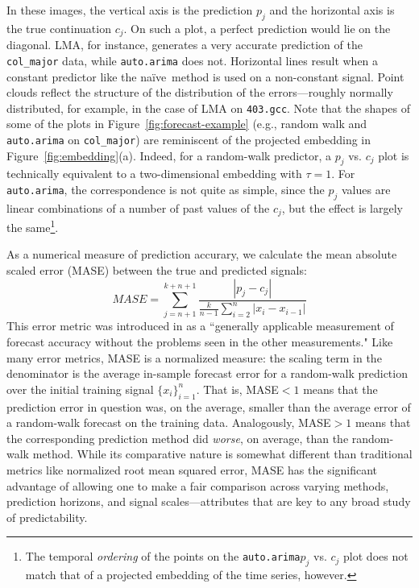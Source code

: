 \documentclass[%
pre,
reprint,
superscriptaddress,
showpacs,
nofootinbib,
nobibnotes,
 amsmath,amssymb,
 aps,
]{revtex4-1}
\newcommand{\gcc}{{\tt 403.gcc}\xspace}
\newcommand{\arima}{{\tt auto.arima}\xspace}
\newcommand{\naive}{na\"ive}
\newcommand{\col}{{\tt col\_major}\xspace}
\begin{document}
In these images, the vertical axis is the prediction $p_j$ and the
horizontal axis is the true continuation $c_j$.  On such a plot, a
perfect prediction would lie on the diagonal.  LMA, for instance,
generates a very accurate prediction of the \col data, while \arima
does not.  Horizontal lines result when a constant predictor like the
\naive ~method is used on a non-constant signal.  Point clouds reflect
the structure of the distribution of the errors---roughly normally
distributed, for example, in the case of LMA on \gcc.  Note that the
shapes of some of the plots in Figure~\ref{fig:forecast-example}
(e.g., random walk and \arima on \col) are reminiscent of the
projected embedding in Figure~\ref{fig:embedding}(a).  Indeed, for a
random-walk predictor, a $p_j$ vs. $c_j$ plot is technically
equivalent to a two-dimensional embedding with $\tau=1$.  For \arima,
the correspondence is not quite as simple, since the $p_j$ values are
linear combinations of a number of past values of the $c_j$, but the
effect is largely the same\footnote{The temporal \emph{ordering} of
  the points on the \arima $p_j$ vs. $c_j$ plot does not match that of
  a projected embedding of the time series, however.}.

As a numerical measure of prediction accurary, we calculate the mean
absolute scaled error (MASE) between the true and predicted signals:
%
$$MASE = \sum_{j=n+1}^{k+n+1}\frac{|p_j-c_j|
}{\frac{k}{n-1}\sum^n_{i=2}|x_{i}-x_{i-1}|}$$
%
This error metric was introduced in \cite{MASE} as a ``generally
applicable measurement of forecast accuracy without the problems seen
in the other measurements."  Like many error metrics, MASE is a
normalized measure: the scaling term in the denominator
%
%
is the average in-sample forecast error for a random-walk prediction
over the initial training signal $\{x_i\}^n_{i=1}$.  That is, MASE$<1$
means that the prediction error in question was, on the average,
smaller than the average error of a random-walk forecast on the
training data.  Analogously, MASE$>1$ means that the corresponding
prediction method did \emph{worse}, on average, than the random-walk
method.  While its comparative nature is somewhat different than
traditional metrics like normalized root mean squared error, MASE has
the significant advantage of allowing one to make a fair comparison
across varying methods, prediction horizons, and signal
scales---attributes that are key to any broad study of predictability.
\end{document}
